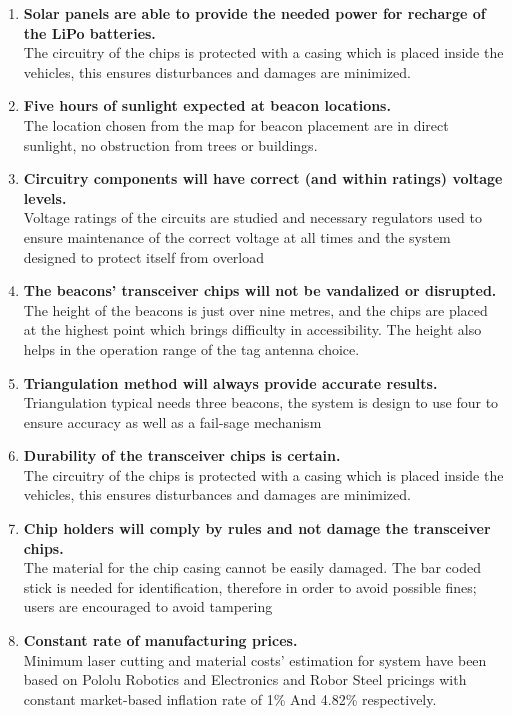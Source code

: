 \begin{enumerate}
\item \textbf{Solar panels are able to provide the needed power for recharge of the LiPo batteries.}\\The circuitry of the chips is protected with a casing which is placed inside the vehicles, this ensures disturbances and damages are minimized.
\item \textbf{Five hours of sunlight expected at beacon locations.}\\The location chosen from the map for beacon placement are in direct sunlight, no obstruction from trees or buildings.
\item \textbf{Circuitry components will have correct (and within ratings) voltage levels.}\\Voltage ratings of the circuits are studied and necessary regulators used to ensure maintenance of the correct voltage at all times and the system designed to protect itself from overload 
\item \textbf{The beacons’ transceiver chips will not be vandalized or disrupted.}\\The height of the beacons is just over nine metres, and the chips are placed at the highest point which brings difficulty in accessibility. The height also helps in the operation range of the tag antenna choice. 
\item \textbf{Triangulation method will always provide accurate results.}\\Triangulation typical needs three beacons, the system is design to use four to ensure accuracy as well as a fail-sage mechanism
\item \textbf{Durability of the transceiver chips is certain.}\\The circuitry of the chips is protected with a casing which is placed inside the vehicles, this ensures disturbances and damages are minimized.
\item \textbf{Chip holders will comply by rules and not damage the transceiver chips.}\\The material for the chip casing cannot be easily damaged. The bar coded stick is needed for identification, therefore in order to avoid possible fines; users are encouraged to avoid tampering
\item \textbf{Constant rate of manufacturing prices.}\\Minimum laser cutting and material costs’ estimation for system have been based on Pololu Robotics and Electronics and Robor Steel pricings with constant market-based inflation rate of 1\% 
And 4.82\% respectively.
\end{enumerate}

